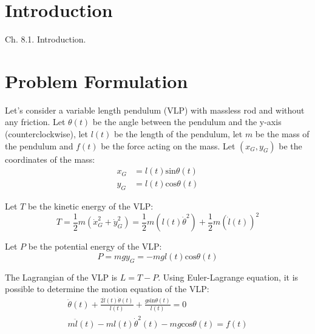 \documentclass[a4paper]{article}
\begin{document}
\tableofcontents
\newpage



\section{Introduction}
Ch. 8.1.
Introduction\cite{Xin:2014:CDA:2584545}.

\section{Problem Formulation}
Let's consider a variable length pendulum (VLP) with massless rod and without any
friction. Let $\theta(t)$ be the angle between the pendulum and the y-axis
(counterclockwise), let $l(t)$ be the length of the pendulum, let $m$ be the mass of 
the pendulum and $f(t)$ be the force acting on the mass. Let $(x_G, y_G)$ be
the coordinates of the mass:
\begin{align}
  x_G &= l(t) \text{sin}\theta(t) \\
  y_G &= l(t) \text{cos}\theta(t)
\end{align}

Let $T$ be the kinetic energy of the VLP:
\begin{equation}
  T = \frac{1}{2} m ( \dot{x}_G^2 + \dot{y}_G^2 )
    = \frac{1}{2} m ( l(t) \dot{\theta}^2 ) +
      \frac{1}{2} m ( \dot{l}(t) )^2
\end{equation}

Let $P$ be the potential energy of the VLP:
\begin{equation}
  P = m g y_G = -m g l(t) \text{cos}\theta(t)
\end{equation}

The Lagrangian of the VLP is $L = T - P$. Using Euler-Lagrange equation, it is 
possible to determine the motion equation of the VLP:
\begin{gather}
  \ddot{\theta}(t) + \frac{2 \dot{l}(t) \dot{\theta}(t)}{l(t)} +
    \frac{g \text{sin}\theta(t)}{l(t)} = 0 \\
  m \ddot{l}(t) - m l(t) \dot{\theta}^2(t) - mg\text{cos}\theta(t) = f(t)
\end{gather}
\end{document}
